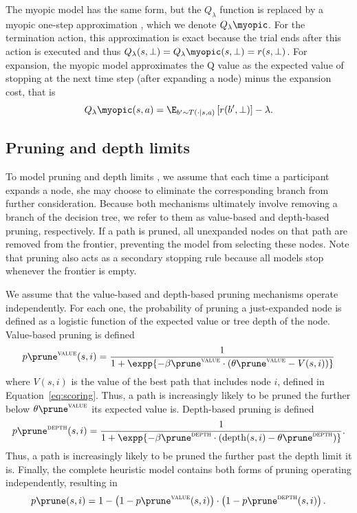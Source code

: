 The myopic model has the same form, but the $Q_\lambda$ function is replaced by a myopic one-step approximation \citep{russell1991principles}, which we denote $Q_\lambda\myopic$. For the termination action, this approximation is exact because the trial ends after this action is executed and thus $Q_\lambda(s, \bot) = Q_\lambda\myopic(s, \bot) = r(s, \bot)$. For expansion, the myopic model approximates the Q value as the expected value of stopping at the next time step (after expanding a node) minus the expansion cost, that is
\begin{equation}
Q_\lambda\myopic(s, a) = \E_{b' \sim T(\cdot \mid s, a)}\left[ 
  r(b', \bot)
\right] - \lambda.
\end{equation}

\subsection{Pruning and depth limits}\label{sec:planning-pruning}
To model pruning \citep{huys2012bonsai,huys2015interplay} and depth limits \citep{keramati2016adaptive,snider2015prospective}, we assume that each time a participant expands a node, she may choose to eliminate the corresponding branch from further consideration. Because both mechanisms ultimately involve removing a branch of the decision tree, we refer to them as value-based and depth-based pruning, respectively. If a path is pruned, all unexpanded nodes on that path are removed from the frontier, preventing the model from selecting these nodes. Note that pruning also acts as a secondary stopping rule because all models stop whenever the frontier is empty. 

We assume that the value-based and depth-based pruning mechanisms operate independently. For each one, the probability of pruning a just-expanded node is defined as a logistic function of the expected value or tree depth of the node. Value-based pruning is defined
%
\begin{equation}
  p\prune^{\textsc{value}}(s, i) = \frac{1}{1 + \expp{
    -\beta\prune^{\textsc{value}} \cdot (\theta\prune^{\textsc{value}}- V(s, i))}}  
\end{equation}
where $V(s, i)$ is the value of the best path that includes node $i$, defined in Equation~\ref{eq:scoring}. Thus, a path is increasingly likely to be pruned the further below $\theta\prune^{\textsc{value}}$ its expected value is. Depth-based pruning is defined
%
\begin{equation}
   p\prune^{\textsc{depth}}(s, i) = \frac{1}{1 + \expp{
    -\beta\prune^{\textsc{depth}} \cdot (\mathrm{depth}(s, i) - \theta\prune^{\textsc{depth}})}}.
\end{equation}
%
Thus, a path is increasingly likely to be pruned the further past the depth limit it is. Finally, the complete heuristic model contains both forms of pruning operating independently, resulting in
\begin{equation}\label{eq:pprune}
  p\prune(s, i) = 1 - \left(1 - p\prune^{\textsc{value}}(s, i)\right)
     \cdot \left(1 - p\prune^{\textsc{depth}}(s, i)\right)
  .
\end{equation}


